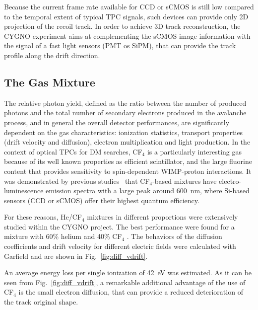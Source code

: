 \documentclass[physics,article,submit,moreauthors,pdftex]{Definitions/mdpi}
\begin{document}
Because the current frame rate available for CCD or sCMOS is still low compared to the temporal extent of typical TPC signals, such devices can provide only 2D projection of the recoil track. In order to achieve 3D track reconstruction, the CYGNO experiment aims at complementing the sCMOS image information with the signal of a fast light sensors (PMT os SiPM), that can provide the track profile along the drift direction.

\subsection{The Gas Mixture}\label{sec:gas}

The relative photon yield, defined as the ratio between the number of produced photons and the total number of secondary electrons produced in the avalanche process, and in general the overall detector performances, are significantly dependent on the gas characteristics: ionization statistics, transport properties (drift velocity and diffusion), electron multiplication and light production. In the context of optical TPCs for DM searches, CF$_4$ is a particularly interesting gas because of its well known properties as efficient scintillator, and the large fluorine content that provides sensitivity to spin-dependent WIMP-proton interactions. It was demonstrated by previous studies~\cite{bib:Fraga} that CF$_4$-based mixtures have electro-luminescence emission spectra with a large peak around 600~nm, where Si-based sensors (CCD or sCMOS) offer their highest quantum efficiency.

For these reasons, He/CF$_{4}$ mixtures in different proportions were extensively studied within the CYGNO project. The best performance were found for a mixture with 60\% helium and 40\% CF$_{4}$ \cite{bib:fe55New, bib:roby}. The behaviors of the diffusion coefficients and drift velocity for different electric fields were calculated with Garfield \cite{bib:garfield1,bib:garfield2} and are shown in Fig.~\ref{fig:diff_vdrift}. 

An average energy loss per single ionization of 42~eV was estimated. As it can be seen from Fig.~\ref{fig:diff_vdrift}, a remarkable additional advantage of the use of CF$_4$ is the small electron diffusion, that can provide a reduced deterioration of the track original shape.
\end{document}
